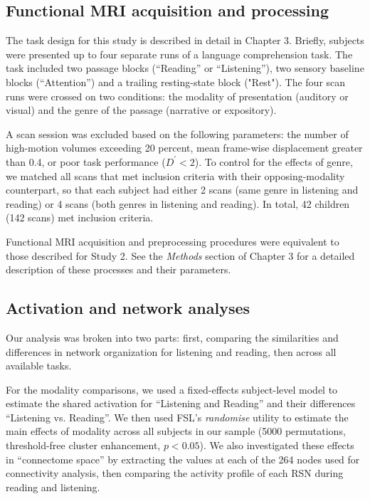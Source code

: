 \subsection{Functional MRI acquisition and processing}

The task design for this study is described in detail in Chapter 3. Briefly, subjects were presented up to four separate runs of a language comprehension task. The task included two passage blocks (``Reading'' or ``Listening''), two sensory baseline blocks (``Attention'') and a trailing resting-state block ("Rest"). The four scan runs were crossed on two conditions: the modality of presentation (auditory or visual) and the genre of the passage (narrative or expository). 

A scan session was excluded based on the following parameters: the number of high-motion volumes exceeding 20 percent, mean frame-wise displacement greater than 0.4, or poor task performance ($D^\prime < 2$). To control for the effects of genre, we matched all scans that met inclusion criteria with their opposing-modality counterpart, so that each subject had either 2 scans (same genre in listening and reading) or 4 scans (both genres in listening and reading). In total, 42 children (142 scans) met inclusion criteria.

Functional MRI acquisition and preprocessing procedures were equivalent to those described for Study 2. See the \textit{Methods} section of Chapter 3 for a detailed description of these processes and their parameters.

\subsection{Activation and network analyses}

Our analysis was broken into two parts: first, comparing the similarities and differences in network organization for listening and reading, then across all available tasks. 

For the modality comparisons, we used a fixed-effects subject-level model to estimate the shared activation for ``Listening and Reading'' and their differences ``Listening vs. Reading''. We then used FSL's \textit{randomise} utility to estimate the main effects of modality across all subjects in our sample (5000 permutations, threshold-free cluster enhancement, $p < 0.05$).  We also investigated these effects in ``connectome space'' by extracting the values at each of the 264 nodes used for connectivity analysis, then comparing the activity profile of each RSN during reading and listening.

